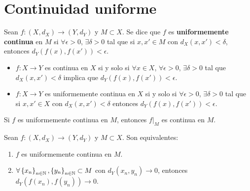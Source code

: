 \section{Continuidad uniforme}
\begin{definition}
Sean $\displaystyle f : \left(X, d _{X}\right) \to \left(Y, d _{Y}\right) $ y $\displaystyle M \subset X $. Se dice que $\displaystyle f $ es \textbf{uniformemente continua} en $\displaystyle M $ si $\displaystyle \forall \epsilon > 0 $, $\displaystyle \exists \delta > 0 $ tal que si $\displaystyle x, x' \in M $ con $\displaystyle d _{X}\left(x,x'\right) < \delta  $, entonces $\displaystyle d _{Y}\left(f\left(x\right), f\left(x'\right)\right) < \epsilon  $. 
\end{definition}
\begin{observation}
\begin{itemize}
\item $\displaystyle f : X \to Y $ es continua en $\displaystyle X $ si y solo si $\displaystyle \forall x \in X $, $\displaystyle \forall \epsilon > 0 $, $\displaystyle \exists \delta > 0 $ tal que $\displaystyle d _{X}\left(x,x'\right) < \delta  $ implica que $\displaystyle d _{Y}\left(f\left(x\right), f\left(x'\right)\right) < \epsilon  $. 
\item $\displaystyle f : X \to Y $ es uniformemente continua en $\displaystyle X $ si y solo si $\displaystyle \forall \epsilon > 0 $, $\displaystyle \exists \delta > 0 $ tal que si $\displaystyle x,x' \in X $ con $\displaystyle d _{X}\left(x,x'\right) < \delta  $ entonces $\displaystyle d _{Y}\left(f\left(x\right), f\left(x'\right)\right) < \epsilon  $. 
\end{itemize}
\end{observation}
\begin{observation}
Si $\displaystyle f $ es uniformemente continua en $\displaystyle M $, entonces $\displaystyle f|_{M} $ es continua en $\displaystyle M $. 
\end{observation}
\begin{theorem}
Sean $\displaystyle f : \left(X, d _{X}\right) \to \left(Y, d _{Y}\right) $ y $\displaystyle M \subset X $. Son equivalentes:
\begin{enumerate}
\item $\displaystyle f $ es uniformemente continua en $\displaystyle M $.
\item $\displaystyle \forall \left\{ x_{n}\right\} _{n\in\mathbb{N}}, \left\{ y_{n}\right\} _{n\in\mathbb{N}} \subset M $ con $\displaystyle d _{Y}\left(x_{n}, y_{n}\right) \to 0 $, entonces $\displaystyle d _{Y} \left(f\left(x_{n}\right), f\left(y_{n}\right)\right) \to 0 $.
\end{enumerate}
\end{theorem}
